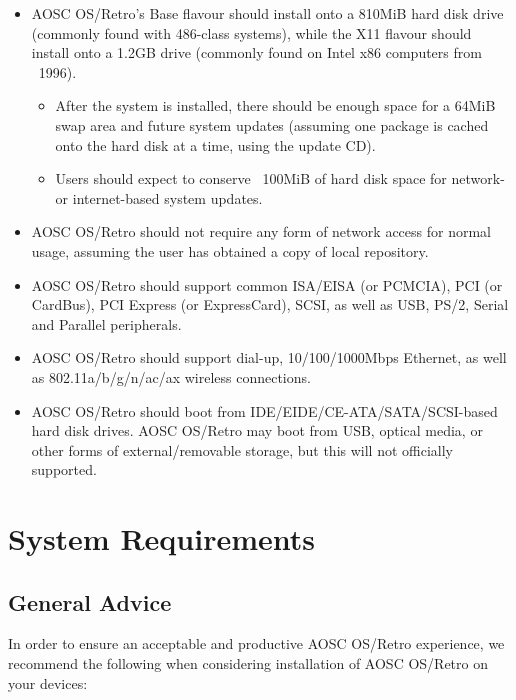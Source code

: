     \begin{itemize}
        \item AOSC OS/Retro's Base flavour should install onto a 810MiB hard disk drive (commonly found with 486-class systems), while the X11 flavour should install onto a 1.2GB drive (commonly found on Intel x86 computers from ~1996).
            \begin{itemize}
                \item After the system is installed, there should be enough space for a 64MiB swap area and future system updates (assuming one package is cached onto the hard disk at a time, using the update CD).
                \item Users should expect to conserve ~100MiB of hard disk space for network- or internet-based system updates.
            \end{itemize}
        \item AOSC OS/Retro should not require any form of network access for normal usage, assuming the user has obtained a copy of local repository.
        \item AOSC OS/Retro should support common ISA/EISA (or PCMCIA), PCI (or CardBus), PCI Express (or ExpressCard), SCSI, as well as USB, PS/2, Serial and Parallel peripherals.
        \item AOSC OS/Retro should support dial-up, 10/100/1000Mbps Ethernet, as well as 802.11a/b/g/n/ac/ax wireless connections.
        \item AOSC OS/Retro should boot from IDE/EIDE/CE-ATA/SATA/SCSI-based hard disk drives. AOSC OS/Retro may boot from USB, optical media, or other forms of external/removable storage, but this will not officially supported.
    \end{itemize}





    \chapter{System Requirements}

    \section{General Advice}

    In order to ensure an acceptable and productive AOSC OS/Retro experience, we recommend the following when considering installation of AOSC OS/Retro on your devices:

